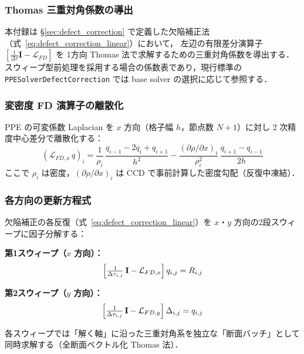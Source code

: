 \subsubsection{Thomas 三重対角係数の導出}
\label{app:sweep_thomas_coeff}

本付録は §\ref{sec:defect_correction} で定義した欠陥補正法（式~\eqref{eq:defect_correction_linear}）において，
左辺の有限差分演算子 $[\frac{1}{\Delta\tau}\mathbf{I} - \mathcal{L}_{FD}]$ を
1方向 Thomas 法で求解するための三重対角係数を導出する．
スウィープ型前処理を採用する場合の係数表であり，現行標準の
\texttt{PPESolverDefectCorrection} では base solver の選択に応じて参照する．

\subsubsection*{変密度 FD 演算子の離散化}

PPE の可変係数 Laplacian を $x$ 方向（格子幅 $h$，節点数 $N+1$）に対し 2 次精度中心差分で離散化する：
\begin{equation}
  (\mathcal{L}_{FD,x}\,q)_i
  = \frac{1}{\rho_i}\,\frac{q_{i-1} - 2q_i + q_{i+1}}{h^2}
    - \frac{(\partial\rho/\partial x)_i}{\rho_i^2}\,\frac{q_{i+1} - q_{i-1}}{2h}
  \label{eq:lfd_x_disc}
\end{equation}
ここで $\rho_i$ は密度，$(\partial\rho/\partial x)_i$ は CCD で事前計算した密度勾配（反復中凍結）．

\subsubsection*{各方向の更新方程式}

欠陥補正の各反復（式~\eqref{eq:defect_correction_linear}）を
$x$・$y$ 方向の2段スウィープに因子分解する：

\textbf{第1スウィープ（$x$ 方向）：}
\begin{equation}
  \Bigl[\tfrac{1}{\Delta\tau_{i,j}}\,\mathbf{I} - \mathcal{L}_{FD,x}\Bigr]\,q_{i,j} = R_{i,j}
  \label{eq:sweep_x}
\end{equation}

\textbf{第2スウィープ（$y$ 方向）：}
\begin{equation}
  \Bigl[\tfrac{1}{\Delta\tau_{i,j}}\,\mathbf{I} - \mathcal{L}_{FD,y}\Bigr]\,\Delta_{i,j} = q_{i,j}
  \label{eq:sweep_y}
\end{equation}

各スウィープでは「解く軸」に沿った三重対角系を独立な「断面バッチ」として同時求解する（全断面ベクトル化 Thomas 法）．

